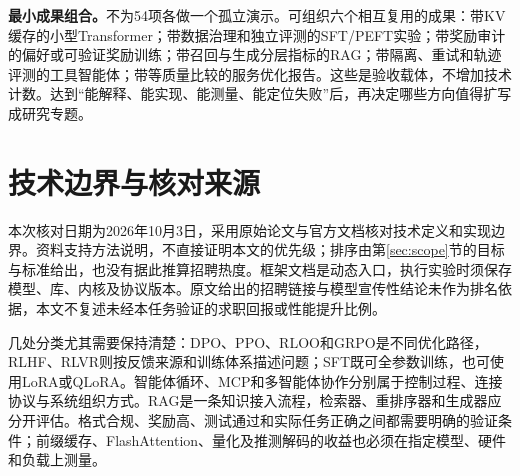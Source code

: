 \documentclass[UTF8,12pt,a4paper,fontset=fandol]{ctexart}
\begin{document}
\textbf{最小成果组合。}不为54项各做一个孤立演示。可组织六个相互复用的成果：带KV缓存的小型Transformer；带数据治理和独立评测的SFT/PEFT实验；带奖励审计的偏好或可验证奖励训练；带召回与生成分层指标的RAG；带隔离、重试和轨迹评测的工具智能体；带等质量比较的服务优化报告。这些是验收载体，不增加技术计数。达到“能解释、能实现、能测量、能定位失败”后，再决定哪些方向值得扩写成研究专题。

\section{技术边界与核对来源}
\label{sec:sources}

本次核对日期为2026年10月3日，采用原始论文与官方文档核对技术定义和实现边界。资料支持方法说明，不直接证明本文的优先级；排序由第\ref{sec:scope}节的目标与标准给出，也没有据此推算招聘热度。框架文档是动态入口，执行实验时须保存模型、库、内核及协议版本。原文给出的招聘链接与模型宣传性结论未作为排名依据，本文不复述未经本任务验证的求职回报或性能提升比例。

几处分类尤其需要保持清楚：DPO、PPO、RLOO和GRPO是不同优化路径，RLHF、RLVR则按反馈来源和训练体系描述问题；SFT既可全参数训练，也可使用LoRA或QLoRA。智能体循环、MCP和多智能体协作分别属于控制过程、连接协议与系统组织方式。RAG是一条知识接入流程，检索器、重排序器和生成器应分开评估。格式合规、奖励高、测试通过和实际任务正确之间都需要明确的验证条件；前缀缓存、FlashAttention、量化及推测解码的收益也必须在指定模型、硬件和负载上测量。
\end{document}
